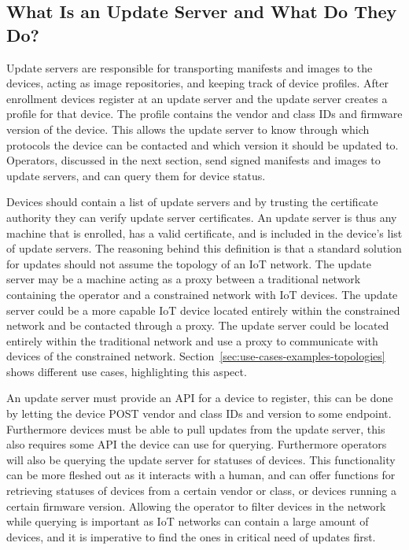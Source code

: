 \documentclass[0-thesis.tex]{subfiles}
\begin{document}
\subsection{What Is an Update Server and What Do They Do?}
\label{ssec:what-is-an-update-server}
Update servers are responsible for transporting manifests and images to the devices,
acting as image repositories, and keeping track of device profiles. After enrollment
devices register at an update server and the update server creates a profile for that
device. The profile contains the vendor and class IDs and firmware version of the device.
This allows the update server to know through which protocols the device can be contacted
and which version it should be updated to. Operators, discussed in the next section, send
signed manifests and images to update servers, and can query them for device status.

Devices should contain a list of update servers and by trusting the certificate authority
they can verify update server certificates. An update server is thus any machine that is
enrolled, has a valid certificate, and is included in the device's list of update servers.
The reasoning behind this definition is that a standard solution for updates should not
assume the topology of an IoT network. The update server may be a machine acting as a
proxy between a traditional network containing the operator and a constrained network with
IoT devices. The update server could be a more capable IoT device located entirely within
the constrained network and be contacted through a proxy. The update server could be
located entirely within the traditional network and use a proxy to communicate with
devices of the constrained network. Section~\ref{sec:use-cases-examples-topologies} shows
different use cases, highlighting this aspect.

An update server must provide an API for a device to register, this can be done by letting
the device POST vendor and class IDs and version to some endpoint. Furthermore devices
must be able to pull updates from the update server, this also requires some API the
device can use for querying. Furthermore operators will also be querying the update server
for statuses of devices. This functionality can be more fleshed out as it interacts with a
human, and can offer functions for retrieving statuses of devices from a certain vendor or
class, or devices running a certain firmware version. Allowing the operator to filter
devices in the network while querying is important as IoT networks can contain a large
amount of devices, and it is imperative to find the ones in critical need of updates
first.
\end{document}

